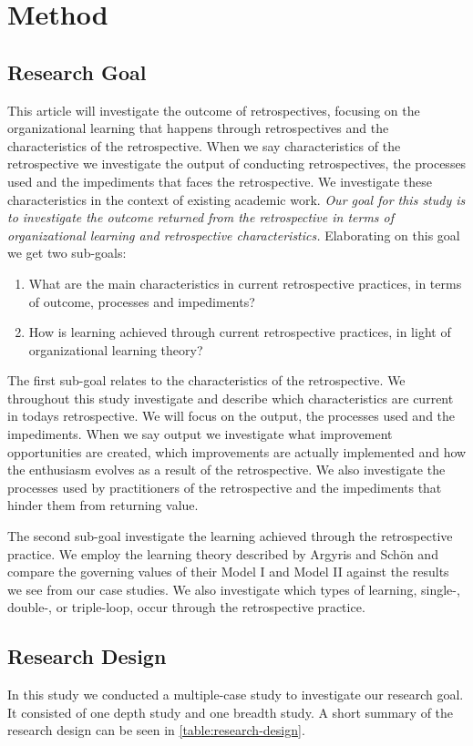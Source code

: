 \section{Method}
\subsection{Research Goal}
 This article will investigate the outcome of retrospectives, focusing on the organizational learning that happens through retrospectives and the characteristics of the retrospective. When we say characteristics of the retrospective we investigate the output of conducting retrospectives, the processes used and the impediments that faces the retrospective. We investigate these characteristics in the context of existing academic work. \textit{Our goal for this study is to investigate the outcome returned from the retrospective in terms of organizational learning and retrospective characteristics.} Elaborating on this goal we get two sub-goals:

\begin{enumerate}
	\item What are the main characteristics in current retrospective practices, in terms of outcome, processes and impediments?
	\item How is learning achieved through current retrospective practices, in light of organizational learning theory?
\end{enumerate}

The first sub-goal relates to the characteristics of the retrospective. We throughout this study investigate and describe which characteristics are current in todays retrospective. We will focus on the output, the processes used and the impediments. When we say output we investigate what improvement opportunities are created, which improvements are actually implemented and how the enthusiasm evolves as a result of the retrospective. We also investigate the processes used by practitioners of the retrospective and the impediments that hinder them from returning value. 

The second sub-goal investigate the learning achieved through the retrospective practice. We employ the learning theory described by Argyris and Schön \cite{Argyris1996} and compare the governing values of their Model I and Model II against the results we see from our case studies. We also investigate which types of learning, single-, double-, or triple-loop, occur through the retrospective practice.

\subsection{Research Design}
In this study we conducted a multiple-case study to investigate our research goal. It consisted of one depth study and one breadth study. A short summary of the research design can be seen in \autoref{table:research-design}.

